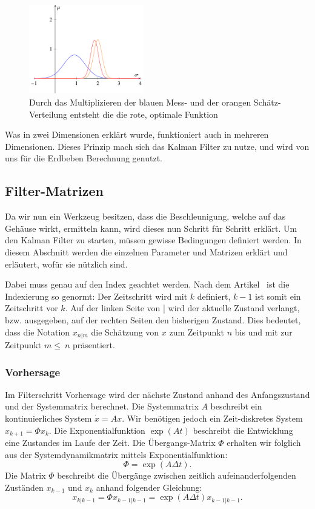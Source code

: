 \begin{figure}
 \begin{center}
 \includegraphics[width=5cm]{papers/erdbeben/Gausskurve3.pdf}
 \caption{Durch das Multiplizieren der blauen Mess- und der orangen Schätz-Verteilung entsteht die die rote, optimale Funktion}
 \label{erdbeben:Gauss3}
 \end{center}
\end{figure}

Was in zwei Dimensionen erklärt wurde, funktioniert auch in mehreren Dimensionen. 
Dieses Prinzip mach sich das Kalman Filter zu nutze, und wird von uns für die Erdbeben Berechnung genutzt. 

\subsection{Filter-Matrizen}
Da wir nun ein Werkzeug besitzen, dass die Beschleunigung, welche auf das Gehäuse wirkt, ermitteln kann, wird dieses nun Schritt für Schritt erklärt. 
Um den Kalman Filter zu starten, müssen gewisse Bedingungen definiert werden. 
In diesem Abschnitt werden die einzelnen Parameter und Matrizen erklärt und erläutert, wofür sie nützlich sind. 

Dabei muss genau auf den Index geachtet werden. Nach dem Artikel~\cite{erdbeben:wikipedia} ist die Indexierung so genormt:
Der Zeitschritt wird mit $k$ definiert, $k-1$ ist somit ein Zeitschritt vor $k$.
Auf der linken Seite von | wird der aktuelle Zustand verlangt, bzw. ausgegeben, auf der rechten Seiten den bisherigen Zustand.
Dies bedeutet, dass die Notation $x_{n|m}$ die Schätzung von $x$ zum Zeitpunkt $n$ bis und mit zur Zeitpunkt $m \leq \ n$ präsentiert. 

\subsubsection*{Vorhersage}
Im Filterschritt Vorhersage wird der nächste Zustand anhand des Anfangszustand und der Systemmatrix berechnet. 
Die Systemmatrix $A$ beschreibt ein kontinuierliches System $\dot x = Ax$. 
Wir benötigen jedoch ein Zeit-diskretes System $x_{k+1} = \Phi x_k$.
Die Exponentialfunktion $\exp(At)$ beschreibt die Entwicklung eine Zustandes im Laufe der Zeit.
Die Übergangs-Matrix $\Phi$ erhalten wir folglich aus der Systemdynamikmatrix mittels Exponentialfunktion: 
\[\Phi = \exp(A\Delta t). \]
Die Matrix $\Phi$ beschreibt die Übergänge zwischen zeitlich aufeinanderfolgenden Zuständen $x_{k-1}$ und $x_{k}$ anhand folgender Gleichung:
\[
{x_{k|k-1}}=\Phi{x_{k-1|k-1}}= \exp(A\Delta t){x_{k-1|k-1}}.
\] 

